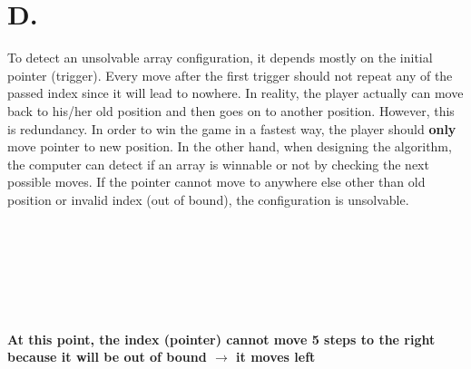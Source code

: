 \documentclass[16pt, letterpaper]{article}
\newcounter{nodeidx}
\newcommand{\nodes}[1]{%
    \foreach \num in {#1}{
      \node[minimum size=6mm, draw, rectangle] (\arabic{nodeidx}) at (\arabic{nodeidx},0) {\num};
      \stepcounter{nodeidx}
    }
    \setcounter{nodeidx}{1}
}
\newcommand{\brckt}[4]{%
  \draw (#1.south west) ++($(-.1, -.1) + (-.1*#3, 0)$) -- ++($(0,-.1) + (0,-#3*1.25em)$) -- node [below] {#4} ($(#2.south east) + (.1,-.1) + (.1*#3, 0) + (0,-.1) + (0,-#3*1.25em)$) -- ++($(0,#3*1.25em) + (0,.1)$);%
}
\begin{document}
\section*{D.}
To detect an unsolvable array configuration, it depends mostly on the initial pointer (trigger). Every move after the first trigger should not repeat any of the passed index since it will lead to nowhere. In reality, the player actually can move back to his/her old position and then goes on to another position. However, this is redundancy. In order to win the game in a fastest way, the player should \textbf{only} move pointer to new position. In the other hand, when designing the algorithm, the computer can detect if an array is winnable or not by checking the next possible moves. If the pointer cannot move to anywhere else other than old position or invalid index (out of bound), the configuration is unsolvable.
\\
\\
\\
\\
\\
\textbf{At this point, the index (pointer) cannot move 5 steps to the right because it will be out of bound $\longrightarrow$ it moves left}
\end{document}
